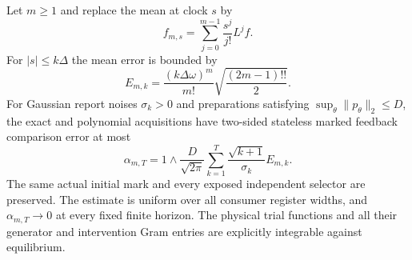 \begin{theorem}
\label{thm:v16-taylor}
Let $m\ge1$ and replace the mean at clock $s$ by
\[
 f_{m,s}=\sum_{j=0}^{m-1}\frac{s^j}{j!}L^jf.
\]
For $|s|\le k\Delta$ the mean error is bounded by
\begin{equation}\label{eq:v16-taylor-error}
 E_{m,k}=\frac{(k\Delta\omega)^m}{m!}
                  \sqrt{\frac{(2m-1)!!}{2}}.
\end{equation}
For Gaussian report noises $\sigma_k>0$ and preparations satisfying
$\sup_\theta\|p_\theta\|_2\le D$, the exact and polynomial
acquisitions have two-sided stateless marked feedback comparison error
at most
\begin{equation}\label{eq:v16-wordbound}
 \alpha_{m,T}=1\wedge\frac{D}{\sqrt{2\pi}}
             \sum_{k=1}^T\frac{\sqrt{k+1}}{\sigma_k}E_{m,k}.
\end{equation}
The same actual initial mark and every exposed independent selector are
preserved. The estimate is uniform over all consumer register widths,
and $\alpha_{m,T}\to0$ at every fixed finite horizon.
The physical trial functions and all their generator and intervention
Gram entries are explicitly integrable against equilibrium.
\end{theorem}
